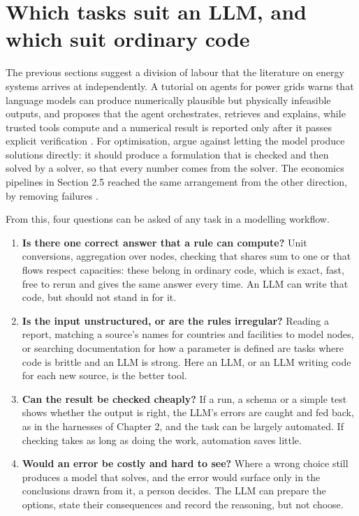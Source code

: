 \section{Which tasks suit an LLM, and which suit ordinary code}

The previous sections suggest a division of labour that the literature on energy systems arrives at independently.
A tutorial on agents for power grids warns that language models can produce numerically plausible but physically infeasible outputs, and proposes that the agent orchestrates, retrieves and explains, while trusted tools compute and a numerical result is reported only after it passes explicit verification \citep{rojas2026llms}.
For optimisation, \citet{hu2025natural} argue against letting the model produce solutions directly: it should produce a formulation that is checked and then solved by a solver, so that every number comes from the solver.
The economics pipelines in Section 2.5 reached the same arrangement from the other direction, by removing failures \citep{zhu2026human}.

From this, four questions can be asked of any task in a modelling workflow.

\begin{enumerate}
  \item \textbf{Is there one correct answer that a rule can compute?} Unit conversions, aggregation over nodes, checking that shares sum to one or that flows respect capacities: these belong in ordinary code, which is exact, fast, free to rerun and gives the same answer every time. An LLM can write that code, but should not stand in for it.
  \item \textbf{Is the input unstructured, or are the rules irregular?} Reading a report, matching a source's names for countries and facilities to model nodes, or searching documentation for how a parameter is defined are tasks where code is brittle and an LLM is strong. Here an LLM, or an LLM writing code for each new source, is the better tool.
  \item \textbf{Can the result be checked cheaply?} If a run, a schema or a simple test shows whether the output is right, the LLM's errors are caught and fed back, as in the harnesses of Chapter 2, and the task can be largely automated. If checking takes as long as doing the work, automation saves little.
  \item \textbf{Would an error be costly and hard to see?} Where a wrong choice still produces a model that solves, and the error would surface only in the conclusions drawn from it, a person decides. The LLM can prepare the options, state their consequences and record the reasoning, but not choose.
\end{enumerate}


